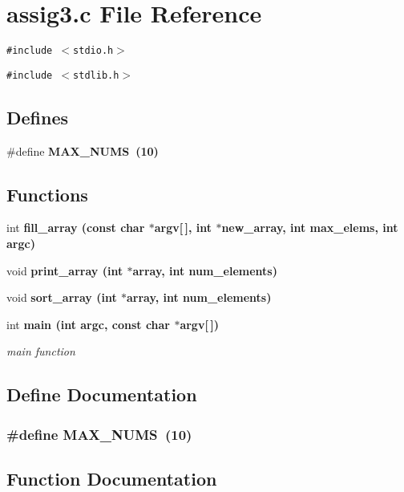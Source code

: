 \section{assig3.c File Reference}
\label{assig3_8c}
{\tt \#include $<$stdio.h$>$}\par
{\tt \#include $<$stdlib.h$>$}\par
\subsection*{Defines}
\begin{CompactItemize}
\item 
\#define \bf{MAX\_\-NUMS}~(10)
\end{CompactItemize}
\subsection*{Functions}
\begin{CompactItemize}
\item 
int \bf{fill\_\-array} (const char $\ast$argv[$\,$], int $\ast$new\_\-array, int max\_\-elems, int argc)
\item 
void \bf{print\_\-array} (int $\ast$array, int num\_\-elements)
\item 
void \bf{sort\_\-array} (int $\ast$array, int num\_\-elements)
\item 
int \bf{main} (int argc, const char $\ast$argv[$\,$])
\begin{CompactList}\small\item\em main function \item\end{CompactList}\end{CompactItemize}


\subsection{Define Documentation}
\subsubsection{\setlength{\rightskip}{0pt plus 5cm}\#define MAX\_\-NUMS~(10)}\label{assig3_8c_c7aa44a8ba8ea1f8b65b9b91481120cc}




\subsection{Function Documentation}
